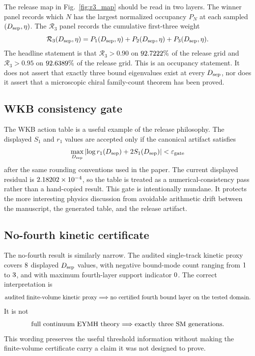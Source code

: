 \documentclass[11pt,a4paper]{article}
\newcommand{\Rthree}{\mathcal{R}_3}
\newcommand{\Dsep}{D_{\rm sep}}
\begin{document}
The release map in Fig.~\ref{fig:r3_map} should be read in two layers.
The winner panel records which \(N\) has the largest normalized occupancy \(P_N\) at each sampled \((\Dsep,\eta)\).
The \(\Rthree\) panel records the cumulative first-three weight
\begin{equation}
    \Rthree(\Dsep,\eta)=P_1(\Dsep,\eta)+P_2(\Dsep,\eta)+P_3(\Dsep,\eta).
\end{equation}
The headline statement is that \(\Rthree>0.90\) on \(92.7222\%\) of the release grid and \(\Rthree>0.95\) on \(92.6389\%\) of the release grid.
This is an occupancy statement.
It does not assert that exactly three bound eigenvalues exist at every \(\Dsep\), nor does it assert that a microscopic chiral family-count theorem has been proved.

\subsection{WKB consistency gate}

The WKB action table is a useful example of the release philosophy.
The displayed \(S_1\) and \(r_1\) values are accepted only if the canonical artifact satisfies
\begin{equation}
    \max_{\Dsep}\left|\log r_1(\Dsep)+2S_1(\Dsep)\right|
    <\varepsilon_{\rm gate}
    \label{eq:wkb_gate}
\end{equation}
after the same rounding conventions used in the paper.
The current displayed residual is \(2.18202\times 10^{-4}\), so the table is treated as a numerical-consistency pass rather than a hand-copied result.
This gate is intentionally mundane.
It protects the more interesting physics discussion from avoidable arithmetic drift between the manuscript, the generated table, and the release artifact.

\subsection{No-fourth kinetic certificate}

The no-fourth result is similarly narrow.
The audited single-track kinetic proxy covers \(8\) displayed \(\Dsep\) values, with negative bound-mode count ranging from \(1\) to \(3\), and with maximum fourth-layer support indicator \(0\).
The correct interpretation is
\begin{equation}
    \hbox{audited finite-volume kinetic proxy}
    \Longrightarrow
    \hbox{no certified fourth bound layer on the tested domain}.
\end{equation}
It is not
\begin{equation}
    \hbox{full continuum EYMH theory}
    \Longrightarrow
    \hbox{exactly three SM generations}.
\end{equation}
This wording preserves the useful threshold information without making the finite-volume certificate carry a claim it was not designed to prove.
\end{document}
